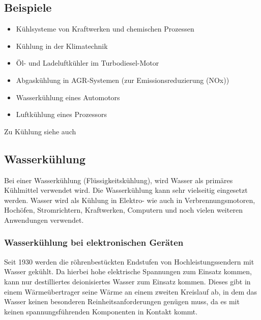 \subsection{Beispiele}

\begin{itemize}
	\item Kühlsysteme von Kraftwerken und chemischen Prozessen
	\item Kühlung in der Klimatechnik
	\item Öl- und Ladeluftkühler im Turbodiesel-Motor
	\item Abgaskühlung in AGR-Systemen (zur Emissionsreduzierung (NOx))
	\item Wasserkühlung eines Automotors
	\item Luftkühlung eines Prozessors
\end{itemize}


Zu Kühlung siehe auch \cite{Kuehlung1,Kuehlung2}

\newpage

\subsection{Wasserkühlung} 

Bei einer Wasserkühlung (Flüssigkeitskühlung), wird Wasser als primäres Kühlmittel verwendet wird. Die Wasserkühlung kann sehr vielseitig eingesetzt werden. Wasser wird als Kühlung in Elektro- wie auch in Verbrennungsmotoren, Hochöfen, Stromrichtern, Kraftwerken, Computern und noch vielen weiteren Anwendungen verwendet.   

\subsubsection{Wasserkühlung bei elektronischen Geräten}

Seit 1930 werden die röhrenbestückten Endstufen von Hochleistungssendern mit Wasser gekühlt. Da hierbei hohe elektrische Spannungen zum Einsatz kommen, kann nur destilliertes deionisiertes Wasser zum Einsatz kommen. Dieses gibt in einem Wärmeübertrager seine Wärme an einem zweiten Kreislauf ab, in dem das Wasser keinen besonderen Reinheitsanforderungen genügen muss, da es mit keinen spannungsführenden Komponenten in Kontakt kommt.

